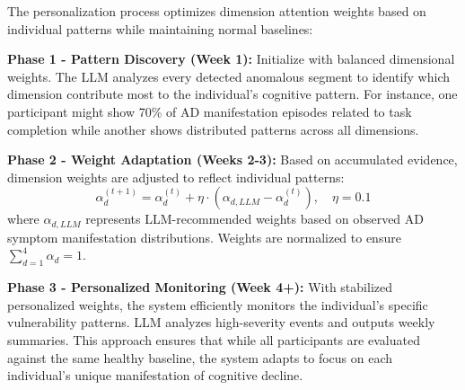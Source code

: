 \documentclass[sigconf, anonymous, 9pt, nonacm]{acmart}
\begin{document}
The personalization process optimizes dimension attention weights based on individual patterns while maintaining normal baselines:

\noindent\textbf{Phase 1 - Pattern Discovery (Week 1):} Initialize with balanced dimensional weights. The LLM analyzes every detected anomalous segment to identify which dimension contribute most to the individual's cognitive pattern. For instance, one participant might show 70\% of AD manifestation episodes related to task completion while another shows distributed patterns across all dimensions.

\noindent\textbf{Phase 2 - Weight Adaptation (Weeks 2-3):} Based on accumulated evidence, dimension weights are adjusted to reflect individual patterns:
\begin{equation*}
\alpha_d^{(t+1)} = \alpha_d^{(t)} + \eta \cdot (\alpha_{d,LLM} - \alpha_d^{(t)}), \quad \eta = 0.1
\end{equation*}
where $\alpha_{d,LLM}$ represents LLM-recommended weights based on observed AD symptom manifestation distributions. Weights are normalized to ensure $\sum_{d=1}^{4}\alpha_d = 1$.

\noindent\textbf{Phase 3 - Personalized Monitoring (Week 4+):} With stabilized personalized weights, the system efficiently monitors the individual's specific vulnerability patterns. LLM analyzes high-severity events and outputs weekly summaries. This approach ensures that while all participants are evaluated against the same healthy baseline, the system adapts to focus on each individual's unique manifestation of cognitive decline.
\end{document}
